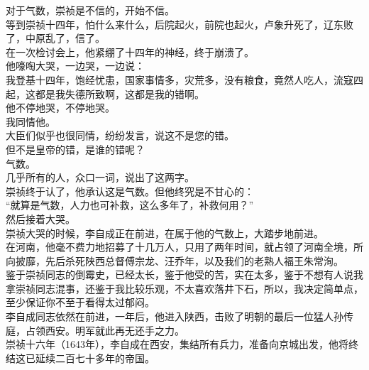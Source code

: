 \begin{multicols}{\theparacolNo}
对于气数，崇祯是不信的，开始不信。\\

等到崇祯十四年，怕什么来什么，后院起火，前院也起火，卢象升死了，辽东败了，中原乱了，信了。\\

在一次检讨会上，他紧绷了十四年的神经，终于崩溃了。\\

他嚎啕大哭，一边哭，一边说：\\

我登基十四年，饱经忧患，国家事情多，灾荒多，没有粮食，竟然人吃人，流寇四起，这都是我失德所致啊，这都是我的错啊。\\

他不停地哭，不停地哭。\\

我同情他。\\

大臣们似乎也很同情，纷纷发言，说这不是您的错。\\

但不是皇帝的错，是谁的错呢？\\

气数。\\

几乎所有的人，众口一词，说出了这两字。\\

崇祯终于认了，他承认这是气数。但他终究是不甘心的：\\

“就算是气数，人力也可补救，这么多年了，补救何用？”\\

然后接着大哭。\\

崇祯大哭的时候，李自成正在前进，在属于他的气数上，大踏步地前进。\\

在河南，他毫不费力地招募了十几万人，只用了两年时间，就占领了河南全境，所向披靡，先后杀死陕西总督傅宗龙、汪乔年，以及我们的老熟人福王朱常洵。\\

鉴于崇祯同志的倒霉史，已经太长，鉴于他受的苦，实在太多，鉴于不想有人说我拿崇祯同志混事，还鉴于我比较乐观，不太喜欢落井下石，所以，我决定简单点，至少保证你不至于看得太过郁闷。\\

李自成同志依然在前进，一年后，他进入陕西，击败了明朝的最后一位猛人孙传庭，占领西安。明军就此再无还手之力。\\

崇祯十六年（1643年），李自成在西安，集结所有兵力，准备向京城出发，他将终结这已延续二百七十多年的帝国。\\


\end{multicols}
